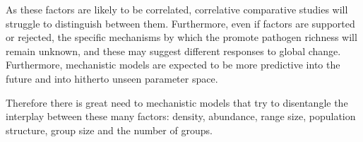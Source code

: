 As these factors are likely to be correlated, correlative comparative studies will struggle to distinguish between them.
Furthermore, even if factors are supported or rejected, the specific mechanisms by which the promote pathogen richness will remain unknown, and these may suggest different responses to global change.
Furthermore, mechanistic models are expected to be more predictive into the future and into hitherto unseen parameter space.





Therefore there is great need to mechanistic models that try to disentangle the interplay between these many factors: density, abundance, range size, population structure, group size and the number of groups.



































